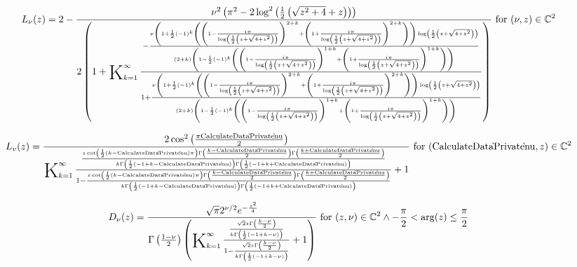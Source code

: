 \documentclass{article}
\newcommand{\bigK}{\mathop{\raisebox{-5pt}{\huge K}}}
\begin{document}
\[L_{\nu }(z)=2-\frac{\nu ^2 \left(\pi ^2-2 \log ^2\left(\frac{1}{2} \left(\sqrt{z^2+4}+z\right)\right)\right)}{2 \left(1+\bigK_{k=1}^{\infty}\frac{-\frac{\nu  \left(1+\frac{1}{2} (-1)^k \left(\left(1-\frac{i \pi }{\log \left(\frac{1}{2} \left(z+\sqrt{4+z^2}\right)\right)}\right)^{2+k}+\left(1+\frac{i \pi }{\log \left(\frac{1}{2} \left(z+\sqrt{4+z^2}\right)\right)}\right)^{2+k}\right)\right) \log \left(\frac{1}{2} \left(z+\sqrt{4+z^2}\right)\right)}{(2+k) \left(1-\frac{1}{2} (-1)^k \left(\left(1-\frac{i \pi }{\log \left(\frac{1}{2} \left(z+\sqrt{4+z^2}\right)\right)}\right)^{1+k}+\left(1+\frac{i \pi }{\log \left(\frac{1}{2} \left(z+\sqrt{4+z^2}\right)\right)}\right)^{1+k}\right)\right)}}{1+\frac{\nu  \left(1+\frac{1}{2} (-1)^k \left(\left(1-\frac{i \pi }{\log \left(\frac{1}{2} \left(z+\sqrt{4+z^2}\right)\right)}\right)^{2+k}+\left(1+\frac{i \pi }{\log \left(\frac{1}{2} \left(z+\sqrt{4+z^2}\right)\right)}\right)^{2+k}\right)\right) \log \left(\frac{1}{2} \left(z+\sqrt{4+z^2}\right)\right)}{(2+k) \left(1-\frac{1}{2} (-1)^k \left(\left(1-\frac{i \pi }{\log \left(\frac{1}{2} \left(z+\sqrt{4+z^2}\right)\right)}\right)^{1+k}+\left(1+\frac{i \pi }{\log \left(\frac{1}{2} \left(z+\sqrt{4+z^2}\right)\right)}\right)^{1+k}\right)\right)}}\right)}\text{ for }(\nu ,z)\in \mathbb{C}^2\] 

\[L_v(z)=\frac{2 \cos ^2\left(\frac{\pi  \text{CalculateData$\grave{ }$Private$\grave{ }$nu}}{2}\right)}{\bigK_{k=1}^{\infty}\frac{\frac{z \cot \left(\frac{1}{2} (k-\text{CalculateData$\grave{ }$Private$\grave{ }$nu}) \pi \right) \Gamma \left(\frac{k-\text{CalculateData$\grave{ }$Private$\grave{ }$nu}}{2}\right) \Gamma \left(\frac{k+\text{CalculateData$\grave{ }$Private$\grave{ }$nu}}{2}\right)}{k \Gamma \left(\frac{1}{2} (-1+k-\text{CalculateData$\grave{ }$Private$\grave{ }$nu})\right) \Gamma \left(\frac{1}{2} (-1+k+\text{CalculateData$\grave{ }$Private$\grave{ }$nu})\right)}}{1-\frac{z \cot \left(\frac{1}{2} (k-\text{CalculateData$\grave{ }$Private$\grave{ }$nu}) \pi \right) \Gamma \left(\frac{k-\text{CalculateData$\grave{ }$Private$\grave{ }$nu}}{2}\right) \Gamma \left(\frac{k+\text{CalculateData$\grave{ }$Private$\grave{ }$nu}}{2}\right)}{k \Gamma \left(\frac{1}{2} (-1+k-\text{CalculateData$\grave{ }$Private$\grave{ }$nu})\right) \Gamma \left(\frac{1}{2} (-1+k+\text{CalculateData$\grave{ }$Private$\grave{ }$nu})\right)}}+1}\text{ for }(\text{CalculateData$\grave{ }$Private$\grave{ }$nu},z)\in \mathbb{C}^2\] 

\[D_{\nu }(z)=\frac{\sqrt{\pi } 2^{\nu /2} e^{-\frac{z^2}{4}}}{\Gamma \left(\frac{1-\nu }{2}\right) \left(\bigK_{k=1}^{\infty}\frac{\frac{\sqrt{2} z \Gamma \left(\frac{k-\nu }{2}\right)}{k \Gamma \left(\frac{1}{2} (-1+k-\nu )\right)}}{1-\frac{\sqrt{2} z \Gamma \left(\frac{k-\nu }{2}\right)}{k \Gamma \left(\frac{1}{2} (-1+k-\nu )\right)}}+1\right)}\text{ for }(z,\nu )\in \mathbb{C}^2\land -\frac{\pi }{2}<\arg (z)\leq \frac{\pi }{2}\] 
\end{document}
